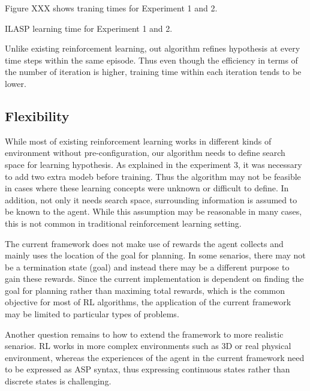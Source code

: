 Figure XXX shows traning times for Experiment 1 and 2.

ILASP learning time for Experiment 1 and 2. 

Unlike existing reinforcement learning,
out algorithm refines hypothesis at every time steps within the same episode.
Thus even though the efficiency in terms of the number of iteration is higher,
training time within each iteration tends to be lower.

\subsection{Flexibility}
\label{sec:flexibility}

While most of existing reinforcement learning works in different kinds of environment without pre-configuration, our algorithm
needs to define search space for learning hypothesis. As explained in the experiment 3, it was necessary to add two extra modeb before training.
Thus the algorithm may not be feasible in cases where these learning concepts were unknown or difficult to define. 
In addition, not only it needs search space, surrounding information is assumed to be known to the agent. 
While this assumption may be reasonable in many cases, this is not common in traditional reinforcement learning setting.

The current framework does not make use of rewards the agent collects and mainly uses the location of the goal for planning.
In some senarios, there may not be a termination state (goal) and instead there may be a different purpose to gain these rewards. 
Since the current implementation is dependent on finding the goal for planning rather than maximing total rewards, which is the common objective for most of RL algorithms,
the application of the current framework may be limited to particular types of problems.

Another question remains to how to extend the framework to more realistic senarios. RL works in more complex environments such as 3D or real physical environment, 
whereas the experiences of the agent in the current framework need to be expressed as ASP syntax, thus expressing continuous states rather than discrete states is challenging.